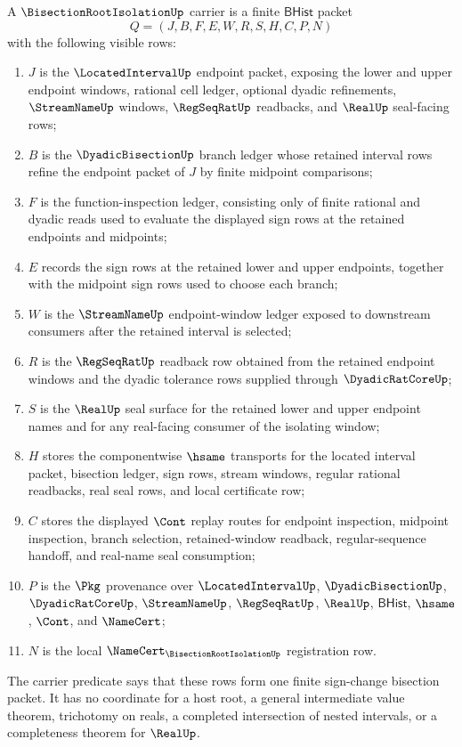 \begin{definition}
\label{def:bisection-root-isolation-carrier}
A $\BisectionRootIsolationUp$ carrier is a finite $\mathsf{BHist}$ packet
$$
Q=(J,B,F,E,W,R,S,H,C,P,N)
$$
with the following visible rows:
\begin{enumerate}
\item $J$ is the $\LocatedIntervalUp$ endpoint packet, exposing the lower and upper endpoint windows, rational cell ledger, optional dyadic refinements, $\StreamNameUp$ windows, $\RegSeqRatUp$ readbacks, and $\RealUp$ seal-facing rows;
\item $B$ is the $\DyadicBisectionUp$ branch ledger whose retained interval rows refine the endpoint packet of $J$ by finite midpoint comparisons;
\item $F$ is the function-inspection ledger, consisting only of finite rational and dyadic reads used to evaluate the displayed sign rows at the retained endpoints and midpoints;
\item $E$ records the sign rows at the retained lower and upper endpoints, together with the midpoint sign rows used to choose each branch;
\item $W$ is the $\StreamNameUp$ endpoint-window ledger exposed to downstream consumers after the retained interval is selected;
\item $R$ is the $\RegSeqRatUp$ readback row obtained from the retained endpoint windows and the dyadic tolerance rows supplied through $\DyadicRatCoreUp$;
\item $S$ is the $\RealUp$ seal surface for the retained lower and upper endpoint names and for any real-facing consumer of the isolating window;
\item $H$ stores the componentwise $\hsame$ transports for the located interval packet, bisection ledger, sign rows, stream windows, regular rational readbacks, real seal rows, and local certificate row;
\item $C$ stores the displayed $\Cont$ replay routes for endpoint inspection, midpoint inspection, branch selection, retained-window readback, regular-sequence handoff, and real-name seal consumption;
\item $P$ is the $\Pkg$ provenance over $\LocatedIntervalUp$, $\DyadicBisectionUp$, $\DyadicRatCoreUp$, $\StreamNameUp$, $\RegSeqRatUp$, $\RealUp$, $\mathsf{BHist}$, $\hsame$, $\Cont$, and $\NameCert$;
\item $N$ is the local $\NameCert_{\BisectionRootIsolationUp}$ registration row.
\end{enumerate}
The carrier predicate says that these rows form one finite sign-change bisection packet. It has no coordinate for a host root, a general intermediate value theorem, trichotomy on reals, a completed intersection of nested intervals, or a completeness theorem for $\RealUp$.
\end{definition}

